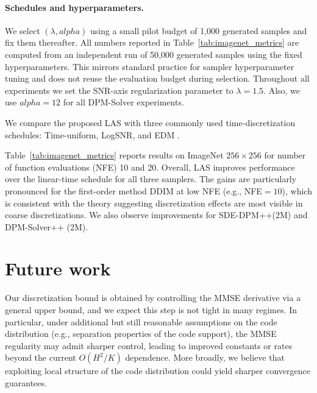 \documentclass[11pt]{article}
\def\alpha{alpha}%
\def\times{×}%
\theoremstyle{definition}
\numberwithin{equation}{section}
\begin{document}
\paragraph{Schedules and hyperparameters.}

We select $(\lambda,\alpha)$ using a small pilot budget of 1{,}000 generated samples and fix them thereafter.
All numbers reported in Table~\ref{tab:imagenet_metrics} are computed from an independent run of 50{,}000 generated
samples using the fixed hyperparameters. This mirrors standard practice for sampler hyperparameter tuning and
does not reuse the evaluation budget during selection.
Throughout all experiments we set
the SNR-axis regularization parameter to $\lambda=1.5$. Also,
we use $\alpha=12$ for all DPM-Solver experiments.

We compare the proposed LAS with three commonly used time-discretization schedules: Time-uniform, LogSNR, and EDM \cite{karras2022elucidating}.

Table~\ref{tab:imagenet_metrics} reports results on ImageNet $256\times256$ for number of function evaluations (NFE) 10 and 20.
Overall, LAS improves performance over the linear-time schedule for all three
samplers. The gains are particularly pronounced for the first-order method DDIM at low NFE (e.g., NFE$=10$),
which is consistent with the theory suggesting discretization effects are most visible in coarse
discretizations. We also observe improvements for SDE-DPM++(2M) and DPM-Solver++ (2M).








\section{Future work}

Our discretization bound is obtained by controlling the MMSE derivative via a general upper bound, and we expect this step is not tight in many regimes. In particular, under additional but still reasonable assumptions on the code distribution (e.g., separation properties of the code support), the MMSE regularity may admit sharper control, leading to improved constants or rates beyond the current $O(H^2/K)$ dependence. More broadly, we believe that exploiting local structure of the code distribution could yield sharper convergence guarantees.
\end{document}
